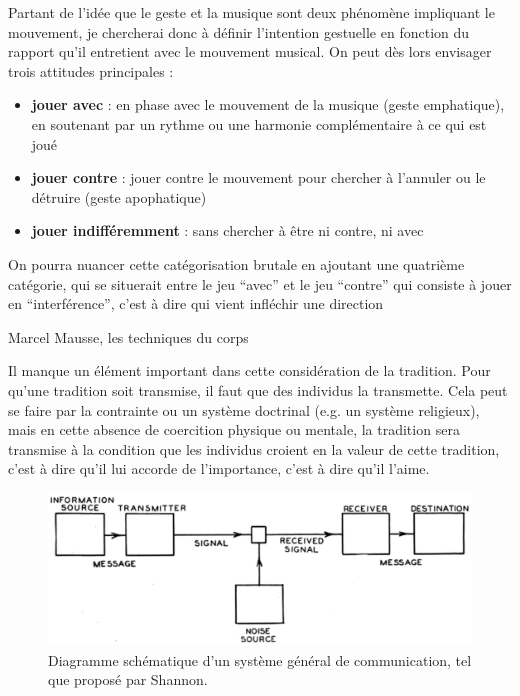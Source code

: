 Partant de l'idée que le geste et la musique sont deux phénomène impliquant le mouvement, je chercherai donc à définir l'intention gestuelle en fonction du rapport qu'il entretient avec le mouvement musical.
On peut dès lors envisager trois attitudes principales :
\vspace{-1em}
\begin{itemize}[noitemsep]
\item \textbf{jouer avec} : en phase avec le mouvement de la musique (geste emphatique), en soutenant par un rythme ou une harmonie complémentaire à ce qui est joué
\item \textbf{jouer contre} : jouer contre le mouvement pour chercher à l'annuler ou le détruire (geste apophatique)
\item \textbf{jouer indifféremment} : sans chercher à être ni contre, ni avec
\end{itemize}

On pourra nuancer cette catégorisation brutale en ajoutant une quatrième catégorie, qui se situerait entre 
le jeu ``avec'' et le jeu ``contre'' qui consiste à jouer en ``interférence'', c'est à dire qui vient infléchir une direction


 Marcel Mausse, les techniques du corps

Il manque un élément important dans cette considération de la tradition. Pour qu'une tradition soit transmise, il faut que des individus la transmette. Cela peut se faire par la contrainte ou un système doctrinal (e.g. un système religieux), mais en cette absence de coercition physique ou mentale, la tradition sera transmise à la condition que les individus croient en la valeur de cette tradition, c'est à dire qu'il lui accorde de l'importance, c'est à dire qu'il l'aime.


\begin{figure}[!htbp]
	\includegraphics[width=\textwidth]{gfx/03_gesture/ShannonCommunicationSystem.png}
	\caption{Diagramme schématique d'un système général de communication, tel que proposé par Shannon.}
	\label{fig:gesture:shannon}
\end{figure}



